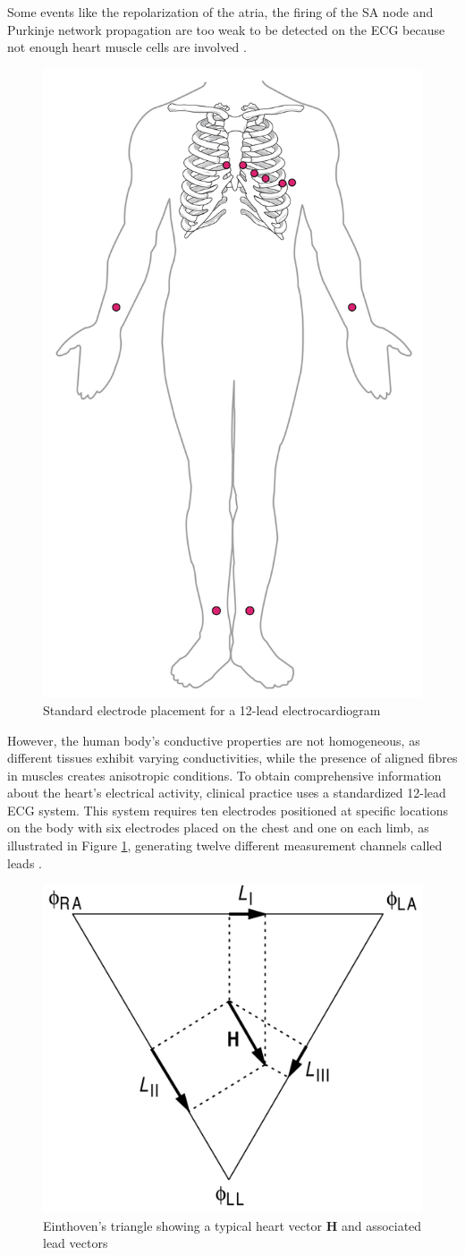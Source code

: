 \noindent Some events like the repolarization of the atria, the firing of the SA node and Purkinje network propagation are too weak to be detected on the ECG because not enough heart muscle cells are involved \cite{m_rangayyan_biomedical_2002}. 

\begin{figure}
    \centering
    \includegraphics[width=0.25\linewidth]{Figures/1-intro/electrode_placement.jpg}
    \caption{Standard electrode placement for a 12-lead electrocardiogram \cite{openstax_cardiovascular_2022}}
    \label{fig:electrode_placement}
\end{figure}

\noindent However, the human body's conductive properties are not homogeneous, as different tissues exhibit varying conductivities, while the presence of aligned fibres in muscles creates anisotropic conditions. To obtain comprehensive information about the heart's electrical activity, clinical practice uses a standardized 12-lead ECG system. This system requires ten electrodes positioned at specific locations on the body with six electrodes placed on the chest and one on each limb, as illustrated in Figure \ref{fig:electrode_placement}, generating twelve different measurement channels called leads \cite{keener_cardiac_1998}.

\begin{figure}[h]
    \centering
    \includegraphics[width=0.35\linewidth]{Figures/1-intro/einthoven_triangle.png}
    \caption{Einthoven's triangle showing a typical heart vector \(\textbf{H}\) and associated lead vectors \cite{keener_cardiac_1998}}
    \label{fig:einthoven_triangle}
\end{figure}

